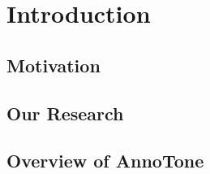 \chapter{Introduction}

\section{Motivation}


\section{Our Research}


\section{Overview of AnnoTone}
